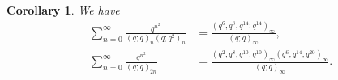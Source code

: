 \documentclass[reqno,12pt]{amsart}
\newtheorem{corollary}[theorem]{Corollary}
\theoremstyle{remark}
\numberwithin{equation}{section}
\begin{document}
\begin{corollary}
We have
\begin{align}
\sum_{n=0}^{\infty}\frac{q^{n^2}}{\left(q;q\right)_n
\left(q;q^2\right)_{n}}
&=\frac{\left(q^6,q^8,q^{14};q^{14}\right)_{\infty}}
{\left(q;q\right)_{\infty}},\tag{S.61}\label{S.61}\\
\sum_{n=0}^{\infty}\frac{q^{n^2}}{\left(q;q\right)_{2n}}
&=\frac{\left(q^2,q^8,q^{10};q^{10}\right)_{\infty}
\left(q^6,q^{14};q^{20}\right)_{\infty}}
{\left(q;q\right)_{\infty}}.\tag{S.98}\label{S.98}
\end{align}
\end{corollary}
\end{document}
